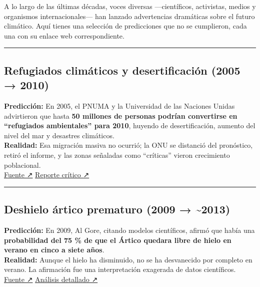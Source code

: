 \documentclass[
  10pt,
  a4paper,
  DIV=11,
  numbers=noendperiod,
  open=any]{scrreprt}
\numberwithin{equation}{chapter}
\numberwithin{equation}{section}
\renewcommand{\[}{\begin{equation}}
\renewcommand{\]}{\end{equation}}
\begin{document}
A lo largo de las últimas décadas, voces diversas ---científicos,
activistas, medios y organismos internacionales--- han lanzado
advertencias dramáticas sobre el futuro climático. Aquí tienes una
selección de predicciones que no se cumplieron, cada una con su enlace
web correspondiente.

\begin{center}\rule{0.5\linewidth}{0.5pt}\end{center}

\subsection{Refugiados climáticos y desertificación (2005 →
2010)}\label{refugiados-climuxe1ticos-y-desertificaciuxf3n-2005-2010}

\textbf{Predicción:} En 2005, el PNUMA y la Universidad de las Naciones
Unidas advirtieron que hasta \textbf{50 millones de personas podrían
convertirse en ``refugiados ambientales'' para 2010}, huyendo de
desertificación, aumento del nivel del mar y desastres climáticos.\\
\textbf{Realidad:} Esa migración masiva no ocurrió; la ONU se distanció
del pronóstico, retiró el informe, y las zonas señaladas como
``críticas'' vieron crecimiento poblacional.\\
\href{https://www.theguardian.com/environment/2005/oct/12/naturaldisasters.climatechange1}{Fuente
↗} \textbar{}
\href{https://climate-diplomacy.org/magazine/conflict/un-embarrassed-forecast-climate-refugees}{Reporte
crítico ↗}

\begin{center}\rule{0.5\linewidth}{0.5pt}\end{center}

\subsection{Deshielo ártico prematuro (2009 →
\textasciitilde2013)}\label{deshielo-uxe1rtico-prematuro-2009-2013}

\textbf{Predicción:} En 2009, Al Gore, citando modelos científicos,
afirmó que había una \textbf{probabilidad del 75 \% de que el Ártico
quedara libre de hielo en verano en cinco a siete años}.\\
\textbf{Realidad:} Aunque el hielo ha disminuido, no se ha desvanecido
por completo en verano. La afirmación fue una interpretación exagerada
de datos científicos.\\
\href{https://www.reuters.com/article/fact-check/al-gore-did-not-predict-ice-caps-melting-by-2013-but-misrepresented-data-idUSL1N2RV0K6}{Fuente
↗} \textbar{}
\href{https://www.politifact.com/factchecks/2023/may/31/alex-epstein/chart-on-arctic-sea-ice-extent-has-no-bearing-on-a/}{Análisis
detallado ↗}
\end{document}
